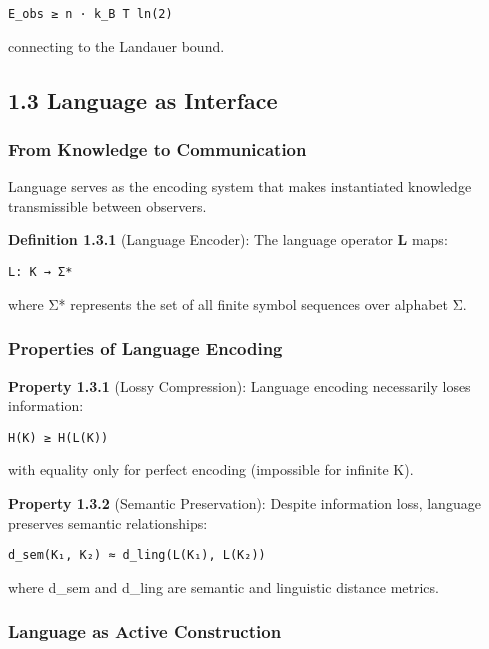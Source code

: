 \begin{verbatim}
E_obs ≥ n · k_B T ln(2)
\end{verbatim}

connecting to the Landauer bound.

\subsection{1.3 Language as Interface}\label{language-as-interface}

\subsubsection{From Knowledge to
Communication}\label{from-knowledge-to-communication}

Language serves as the encoding system that makes instantiated knowledge
transmissible between observers.

\textbf{Definition 1.3.1} (Language Encoder): The language operator
\textbf{L} maps:

\begin{verbatim}
L: K → Σ*
\end{verbatim}

where Σ* represents the set of all finite symbol sequences over alphabet
Σ.

\subsubsection{Properties of Language
Encoding}\label{properties-of-language-encoding}

\textbf{Property 1.3.1} (Lossy Compression): Language encoding
necessarily loses information:

\begin{verbatim}
H(K) ≥ H(L(K))
\end{verbatim}

with equality only for perfect encoding (impossible for infinite K).

\textbf{Property 1.3.2} (Semantic Preservation): Despite information
loss, language preserves semantic relationships:

\begin{verbatim}
d_sem(K₁, K₂) ≈ d_ling(L(K₁), L(K₂))
\end{verbatim}

where d\_sem and d\_ling are semantic and linguistic distance metrics.

\subsubsection{Language as Active
Construction}\label{language-as-active-construction}

